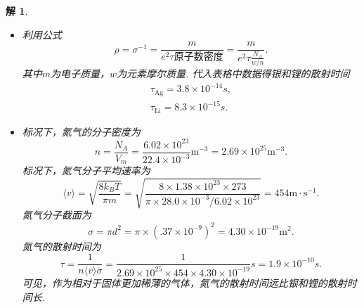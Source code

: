 \documentclass[UTF8,10pt,a4paper]{article}
\theoremstyle{Problem}
\theoremstyle{Solution}
\newtheorem*{sol}{解}
\begin{document}
\begin{sol}
    \begin{itemize}
        \item[$\triangleright$] 利用公式
        \begin{equation}
            \rho=\sigma^{-1}=\frac{m}{e^2\tau\text{原子数密度}}=\frac{m}{e^2\tau\frac{N_A}{w/n}}.
        \end{equation}
        其中$m$为电子质量，$w$为元素摩尔质量.
        代入表格中数据得银和锂的散射时间
        \begin{gather}
            \tau_{\text{Ag}}=3.8\times 10^{-14}s,\\
            \tau_{\text{Li}}=8.3\times 10^{-15}s.
        \end{gather}
        \item[$\triangleright$] 标况下，氮气的分子密度为
        \begin{equation}
            n=\frac{N_A}{V_m}=\frac{6.02\times 10^{23}}{22.4\times 10^{-3}}\text{m}^{-3}=2.69\times 10^{25}\text{m}^{-3}.
        \end{equation}
        标况下，氮气分子平均速率为
        \begin{equation}
            \langle v\rangle=\sqrt{\frac{8k_BT}{\pi m}}=\sqrt{\frac{8\times 1.38\times 10^{23}\times 273}{\pi\times 28.0\times 10^{-3}/6.02\times 10^{23}}}=454\text{m}\cdot\text{s}^{-1}.
        \end{equation}
        氮气分子截面为
        \begin{equation}
            \sigma=\pi d^2=\pi\times(.37\times10^{-9})^2=4.30\times 10^{-19}\text{m}^2.
        \end{equation}
        氮气的散射时间为
        \begin{equation}
            \tau=\frac{1}{n\langle v\rangle\sigma}=\frac{1}{2.69\times 10^{25}\times 454\times 4.30\times 10^{-19}}s=1.9\times 10^{-10}s.
        \end{equation}
        可见，作为相对于固体更加稀薄的气体，氮气的散射时间远比银和锂的散射时间长.
    \end{itemize}
\end{sol}
\end{document}
